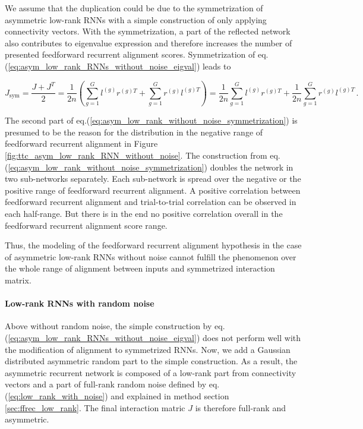 \documentclass[11pt]{article}
\begin{document}
	We assume that the duplication could be due to the symmetrization of asymmetric low-rank RNNs with a simple construction of only applying connectivity vectors. With the symmetrization, a part of the reflected network also contributes to eigenvalue expression and therefore increases the number of presented feedforward recurrent alignment scores. Symmetrization of eq.(\ref{eq:asym_low_rank_RNNs_without_noise_eigval}) leads to
	
		\begin{equation} \label{eq:asym_low_rank_without_noise_symmetrization}
			J_{\text{sym}} = \frac{J + J^T}{2} = \frac{1}{2n} \left( \sum_{g=1}^{G} l^{(g)} r^{(g)T} + \sum_{g=1}^{G} r^{(g)} l^{(g)T}\right) = \frac{1}{2n} \sum_{g=1}^{G} l^{(g)} r^{(g)T} + \frac{1}{2n} \sum_{g=1}^{G} r^{(g)} l^{(g)T} \, .
		\end{equation}
	
	
	The second part of eq.(\ref{eq:asym_low_rank_without_noise_symmetrization}) is presumed to be the reason for the distribution in the negative range of feedforward recurrent alignment in Figure \ref{fig:ttc_asym_low_rank_RNN_without_noise}. The construction from eq.(\ref{eq:asym_low_rank_without_noise_symmetrization}) doubles the network in two sub-networks separately. Each sub-network is spread over the negative or the positive range of feedforward recurrent alignment. A positive correlation between feedforward recurrent alignment and trial-to-trial correlation can be observed in each half-range. But there is in the end no positive correlation overall in the feedforward recurrent alignment score range. 
	
	Thus, the modeling of the feedforward recurrent alignment hypothesis in the case of asymmetric low-rank RNNs without noise cannot fulfill the phenomenon over the whole range of alignment between inputs and symmetrized interaction matrix. 


	\paragraph{Low-rank RNNs with random noise}
	Above without random noise, the simple construction by eq.(\ref{eq:asym_low_rank_RNNs_without_noise_eigval}) does not perform well with the modification of alignment to symmetrized RNNs. Now, we add a Gaussian distributed asymmetric random part to the simple construction. As a result, the asymmetric recurrent network is composed of a low-rank part from connectivity vectors and a part of full-rank random noise defined by eq. (\ref{eq:low_rank_with_noise}) and explained in method section \ref{sec:ffrec_low_rank}. The final interaction matric $J$ is therefore full-rank and asymmetric. 
	
\end{document}
